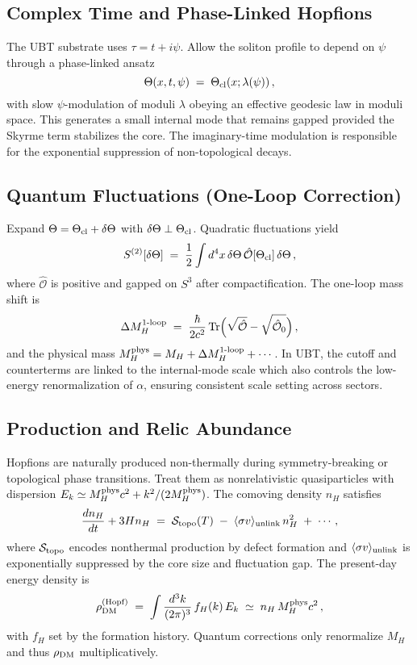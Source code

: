 \subsection{Complex Time and Phase-Linked Hopfions}
The UBT substrate uses $\tau=t+i\psi$. Allow the soliton profile to depend on $\psi$ through a phase-linked ansatz
\begin{equation}
\Theta(x,t,\psi) \;=\; \Theta_{\rm cl}(x;\lambda(\psi))\,,
\end{equation}
with slow $\psi$-modulation of moduli $\lambda$ obeying an effective geodesic law in moduli space.
This generates a small internal mode that remains gapped provided the Skyrme term stabilizes the core.
The imaginary-time modulation is responsible for the exponential suppression of non-topological decays.

\subsection{Quantum Fluctuations (One-Loop Correction)}
Expand $\Theta=\Theta_{\rm cl}+\delta\Theta$ with $\delta\Theta\perp \Theta_{\rm cl}$. Quadratic fluctuations yield
\begin{equation}
S^{(2)}[\delta\Theta] \;=\; \frac{1}{2}\int d^4x\, \delta\Theta\,\hat{\mathcal{O}}[\Theta_{\rm cl}]\,\delta\Theta\,,
\end{equation}
where $\hat{\mathcal{O}}$ is positive and gapped on $S^3$ after compactification.
The one-loop mass shift is
\begin{equation}
\Delta M_{H}^{\rm 1\text{-}loop} \;=\; \frac{\hbar}{2c^2}\,\mathrm{Tr}\Big(\sqrt{\hat{\mathcal{O}}}-\sqrt{\hat{\mathcal{O}}_0}\Big)\,,
\end{equation}
and the physical mass $M_H^{\rm phys}=M_H+\Delta M_H^{\rm 1\text{-}loop}+\cdots$.
In UBT, the cutoff and counterterms are linked to the internal-mode scale which also controls the low-energy renormalization of $\alpha$,
ensuring consistent scale setting across sectors.

\subsection{Production and Relic Abundance}
Hopfions are naturally produced non-thermally during symmetry-breaking or topological phase transitions.
Treat them as nonrelativistic quasiparticles with dispersion $E_k\simeq M_H^{\rm phys}c^2 + k^2/(2M_H^{\rm phys})$.
The comoving density $n_H$ satisfies
\begin{equation}
\frac{dn_H}{dt}+3H n_H \;=\; \mathcal{S}_{\rm topo}(T)\;-\;\langle\sigma v\rangle_{\rm unlink}\, n_H^2 \;+\; \cdots,
\end{equation}
where $\mathcal{S}_{\rm topo}$ encodes nonthermal production by defect formation and $\langle\sigma v\rangle_{\rm unlink}$ is exponentially suppressed by the core size and fluctuation gap.
The present-day energy density is
\begin{equation}
\rho_{\rm DM}^{\rm (Hopf)} \;=\; \int \frac{d^3k}{(2\pi)^3}\, f_H(k)\, E_k
\;\simeq\; n_H\, M_H^{\rm phys}c^2\,,
\end{equation}
with $f_H$ set by the formation history. Quantum corrections only renormalize $M_H$ and thus $\rho_{\rm DM}$ multiplicatively.

